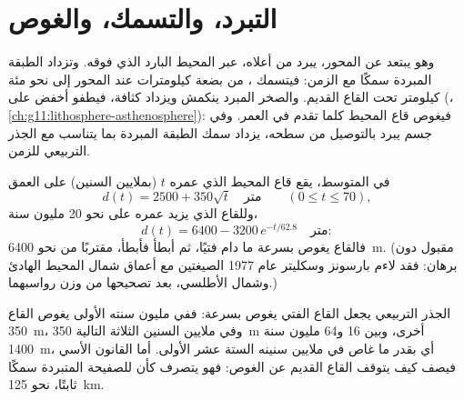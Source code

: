 \section{التبرد، والتسمك، والغوص}

وهو يبتعد عن المحور، يبرد  من أعلاه، عبر
المحيط البارد الذي فوقه. وتزداد الطبقة المبردة سمكًا مع الزمن: فيتسمك
، من بضعة كيلومترات عند المحور إلى نحو مئة
كيلومتر تحت القاع القديم. والصخر المبرد ينكمش ويزداد كثافة، فيطفو
 أخفض على  (،
\cref{ch:g11:lithosphere-asthenosphere}): فيغوص قاع المحيط كلما تقدم في العمر.
وفي جسم يبرد بالتوصيل من سطحه، يزداد سمك
الطبقة المبردة بما يتناسب مع الجذر التربيعي للزمن.

\begin{proposition}\label{prop:g11:ocean-ridges:depth-age}
في المتوسط، يقع قاع المحيط الذي عمره $t$ (بملايين السنين) على العمق
\[
  d(t) = 2500 + 350\sqrt{t} \quad \text{متر} \qquad (0 \le t \le 70),
\]
وللقاع الذي يزيد عمره على نحو 20 مليون سنة،
\[
  d(t) = 6400 - 3200\,e^{-t/62.8} \quad \text{متر}:
\]
فالقاع يغوص بسرعة ما دام فتيًا، ثم أبطأ فأبطأ، مقتربًا من
نحو \qty{6400}{m}. (مقبول دون برهان: فقد لاءم بارسونز وسكليتر عام 1977 الصيغتين مع أعماق
شمال المحيط الهادئ وشمال الأطلسي، بعد تصحيحها من وزن
رواسبهما.)
\end{proposition}

الجذر التربيعي يجعل القاع الفتي يغوص بسرعة: ففي مليون سنته الأولى
يغوص القاع \qty{350}{m}، وفي ملايين السنين الثلاثة التالية \qty{350}{m}
أخرى، وبين 16 و64 مليون سنة \qty{1400}{m}، أي بقدر ما غاص
في ملايين سنينه الستة عشر الأولى. أما القانون الأسي فيصف كيف يتوقف القاع
القديم عن الغوص: فهو يتصرف كأن للصفيحة المتبردة سمكًا ثابتًا،
نحو \qty{125}{km}.

